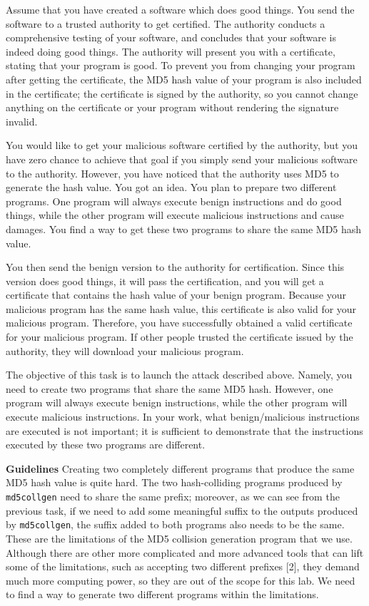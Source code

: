 \documentclass[a4paper]{article}
\begin{document}
Assume that you have created a software which does good things. You send the software to a trusted authority to get certified. The authority conducts a comprehensive testing of your software, and concludes that your software is indeed doing good things. The authority will present you with a certificate, stating that your program is good. To prevent you from changing your program after getting the certificate, the MD5 hash value of your program is also included in the certificate; the certificate is signed by the authority, so you cannot change anything on the certificate or your program without rendering the signature invalid.

You would like to get your malicious software certified by the authority, but you have zero chance to achieve that goal if you simply send your malicious software to the authority. However, you have noticed that the authority uses MD5 to generate the hash value. You got an idea. You plan to prepare two different programs. One program will always execute benign instructions and do good things, while the other program will execute malicious instructions and cause damages. You find a way to get these two programs to share the same MD5 hash value.

You then send the benign version to the authority for certification. Since this version does good things, it will pass the certification, and you will get a certificate that contains the hash value of your benign program. Because your malicious program has the same hash value, this certificate is also valid for your malicious program. Therefore, you have successfully obtained a valid certificate for your malicious program. If other people trusted the certificate issued by the authority, they will download your malicious program.

The objective of this task is to launch the attack described above. Namely, you need to create two programs that share the same MD5 hash. However, one program will always execute benign instructions, while the other program will execute malicious instructions. In your work, what benign/malicious instructions are executed is not important; it is sufficient to demonstrate that the instructions executed by these two programs are different.

\textbf{Guidelines} Creating two completely different programs that produce the same MD5 hash value is quite hard. The two hash-colliding programs produced by \texttt{md5collgen} need to share the same prefix; moreover, as we can see from the previous task, if we need to add some meaningful suffix to the outputs produced by \texttt{md5collgen}, the suffix added to both programs also needs to be the same. These are the limitations of the MD5 collision generation program that we use. Although there are other more complicated and more advanced tools that can lift some of the limitations, such as accepting two different prefixes [2], they demand much more computing power, so they are out of the scope for this lab. We need to find a way to generate two different programs within the limitations.
\end{document}
